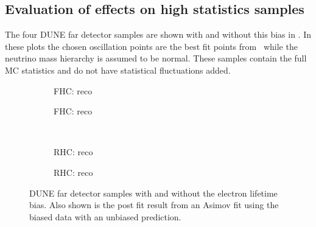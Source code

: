 \subsection{Evaluation of effects on high statistics samples}
\label{sec:pdune_calibration:osc:highStats}

The four DUNE far detector samples are shown with and without this bias in .
In these plots the chosen oscillation points are the best fit points from~\cite{nufit4} while the neutrino mass hierarchy is assumed to be normal.
These samples contain the full MC statistics and do not have statistical fluctuations added.

\begin{figure}[h]
	\begin{subfigure}[t]{.5\textwidth}
		\begin{adjustbox}{max totalsize=\textwidth, center}
			
		\end{adjustbox}
		\caption{FHC: reco \numu}
	\end{subfigure}	
	\hfill
	\begin{subfigure}[t]{.5\textwidth}
		\begin{adjustbox}{max totalsize=\textwidth, center}
			
		\end{adjustbox}
		\caption{FHC: reco \nue}
	\end{subfigure}
	\\
	\begin{subfigure}[t]{.5\textwidth}
		\begin{adjustbox}{max totalsize=\textwidth, center}
			
		\end{adjustbox}
		\caption{RHC: reco \anumu}
	\end{subfigure}	
	\hfill
	\begin{subfigure}[t]{.5\textwidth}
		\begin{adjustbox}{max totalsize=\textwidth, center}
			
		\end{adjustbox}
		\caption{RHC: reco \anue}
	\end{subfigure}	
	\caption[DUNE far detector samples with and without electron lifetime bias]{DUNE far detector samples with and without the electron lifetime bias. Also shown is the post fit result from an Asimov fit using the biased data with an unbiased prediction.}
	\label{fig:fdSamplesLifetime}
\end{figure}

